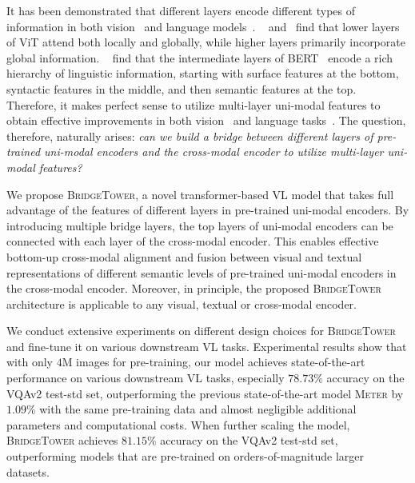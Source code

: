 \documentclass[letterpaper]{article} %
\newcommand{\methodname}[0]{\textsc{BridgeTower}}
\newcommand{\metername}[0]{\textsc{Meter}}
\begin{document}
It has been demonstrated that different layers encode different types of information in both vision~\citep{zeiler2014visualizing,dosovitskiy2020image,du2020selective,raghu2021vision,naseer2021intriguing} and language models~\cite{peters-etal-2018-dissecting,liu2019linguistic,jawahar-etal-2019-bert}. 
~\citet{dosovitskiy2020image} and~\citet{raghu2021vision} find that lower layers of ViT attend both locally and globally, while higher layers primarily incorporate global information. 
~\citet{jawahar-etal-2019-bert} find that the intermediate layers of BERT~\citep{devlin-etal-2019-bert} encode a rich hierarchy of linguistic information, starting with surface features at the bottom, syntactic features in the middle, and then semantic features at the top. 
Therefore, it makes perfect sense to utilize multi-layer uni-modal features to obtain effective improvements in both vision~\citep{lin2017feature, huang2017densely, yu2018deep, zheng2021rethinking, xie2021segformer} and language tasks~\citep{peters-etal-2018-deep, wang2018multi, shen2018dense, dou2018exploiting, sun2019fine}. 
The question, therefore, naturally arises: \textit{can we build a bridge between different layers of pre-trained uni-modal encoders and the cross-modal encoder to utilize multi-layer uni-modal features?} 

We propose \methodname{}, a novel transformer-based VL model that takes full advantage of the features of different layers in pre-trained uni-modal encoders.
By introducing multiple bridge layers, the top layers of uni-modal encoders can be connected with each layer of the cross-modal encoder.
This enables effective bottom-up cross-modal alignment and fusion between visual and textual representations of different semantic levels of pre-trained uni-modal encoders in the cross-modal encoder.
Moreover, in principle, the proposed \methodname{} architecture is applicable to any visual, textual or cross-modal encoder.

We conduct extensive experiments on different design choices for \methodname{} and fine-tune it on various downstream VL tasks.
Experimental results show that with only $4$M images for pre-training, our model achieves state-of-the-art performance on various downstream VL tasks, especially $78.73\%$ accuracy on the VQAv2 test-std set, outperforming the previous state-of-the-art model \metername{} by $1.09\%$ with the same pre-training data and almost negligible additional parameters and computational costs.
When further scaling the model, \methodname{} achieves $81.15\%$ accuracy on the VQAv2 test-std set, outperforming models that are pre-trained on orders-of-magnitude larger datasets.
\end{document}
